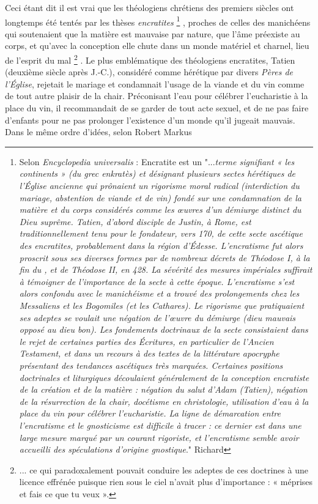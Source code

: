  Ceci étant dit il est vrai que les théologiens chrétiens des premiers siècles ont longtemps été tentés par les thèses \emph{encratites}%
\footnote{Selon \emph{Encyclopedia universalis} : Encratite est un "...\emph{terme signifiant « les continents » (du grec \emph{enkratès}) et désignant plusieurs sectes hérétiques de l'Église ancienne qui prônaient un rigorisme moral radical (interdiction du mariage, abstention de viande et de vin) fondé sur une condamnation de la matière et du corps considérés comme les œuvres d'un démiurge distinct du Dieu suprême. Tatien, d'abord disciple de Justin, à Rome, est traditionnellement tenu pour le fondateur, vers 170, de cette secte ascétique des encratites, probablement dans la région d'Édesse. L'encratisme fut alors proscrit sous ses diverses formes par de nombreux décrets de Théodose I\ier, à la fin du , et de Théodose II, en 428.
La sévérité des mesures impériales suffirait à témoigner de l'importance de la secte à cette époque. L'encratisme s'est alors confondu avec le manichéisme et a trouvé des prolongements chez les Messaliens et les Bogomiles (et les Cathares). Le rigorisme que pratiquaient ses adeptes se voulait une négation de l'œuvre du \emph{démiurge} (dieu mauvais opposé au dieu bon). Les fondements doctrinaux de la secte consistaient dans le rejet de certaines parties des Écritures, en particulier de l'Ancien Testament, et dans un recours à des textes de la littérature apocryphe présentant des tendances ascétiques très marquées. Certaines positions doctrinales et liturgiques découlaient généralement de la conception encratiste de la création et de la matière : négation du salut d'Adam (Tatien), négation de la résurrection de la chair, docétisme en christologie, utilisation d'eau à la place du vin pour célébrer l'eucharistie. La ligne de démarcation entre l'encratisme et le gnosticisme est difficile à tracer : ce dernier est dans une large mesure marqué par un courant rigoriste, et l'encratisme semble avoir accueilli des spéculations d'origine gnostique}."
Richard }%
, proches de celles des manichéens qui soutenaient que la matière est mauvaise par nature, que l'âme préexiste au corps, et qu'avec la conception elle chute dans un monde matériel et charnel, lieu de l'esprit du mal
\footnote{... ce qui paradoxalement pouvait conduire les adeptes de ces doctrines à une licence effrénée puisque rien sous le ciel n'avait plus d'importance : « méprises et fais ce que tu veux ».}%
. Le plus emblématique des théologiens encratites, Tatien (deuxième siècle après J.-C.), considéré comme hérétique par divers \emph{Pères de l'Église}, rejetait le mariage et condamnait l'usage de la viande et du vin comme de tout autre plaisir de la chair. Préconisant l'eau pour célébrer l'eucharistie à la place du vin, il recommandait de se garder de tout acte sexuel, et de ne pas faire d'enfants pour ne pas prolonger l'existence d'un monde qu'il jugeait mauvais.  Dans le même ordre d'idées, selon Robert Markus%
